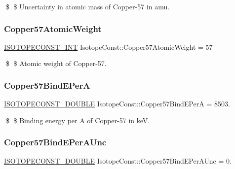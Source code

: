 \$ \$ Uncertainty in atomic mass of Copper-\/57 in amu. \mbox{\label{group___isotope_const-_copper-_cu57_ga404571e1951fa45e4c5f4a4f97b79bee}} 
\subsubsection{\texorpdfstring{Copper57\+Atomic\+Weight}{Copper57AtomicWeight}}
{\footnotesize\ttfamily \mbox{\hyperlink{group___isotope_const-_macros_ga5f18360b3e99483a35c32d789e62621c}{I\+S\+O\+T\+O\+P\+E\+C\+O\+N\+S\+T\+\_\+\+I\+NT}} Isotope\+Const\+::\+Copper57\+Atomic\+Weight = 57}

\$ \$ Atomic weight of Copper-\/57. \mbox{\label{group___isotope_const-_copper-_cu57_gab14120593a288dc566cf936b29a5cf2d}} 
\subsubsection{\texorpdfstring{Copper57\+Bind\+E\+PerA}{Copper57BindEPerA}}
{\footnotesize\ttfamily \mbox{\hyperlink{group___isotope_const-_macros_ga8f45a7272ce02c0b4c65c44636ed719a}{I\+S\+O\+T\+O\+P\+E\+C\+O\+N\+S\+T\+\_\+\+D\+O\+U\+B\+LE}} Isotope\+Const\+::\+Copper57\+Bind\+E\+PerA = 8503.}

\$ \$ Binding energy per A of Copper-\/57 in keV. \mbox{\label{group___isotope_const-_copper-_cu57_ga33245aefefe685427bd296c883bf00f5}} 
\subsubsection{\texorpdfstring{Copper57\+Bind\+E\+Per\+A\+Unc}{Copper57BindEPerAUnc}}
{\footnotesize\ttfamily \mbox{\hyperlink{group___isotope_const-_macros_ga8f45a7272ce02c0b4c65c44636ed719a}{I\+S\+O\+T\+O\+P\+E\+C\+O\+N\+S\+T\+\_\+\+D\+O\+U\+B\+LE}} Isotope\+Const\+::\+Copper57\+Bind\+E\+Per\+A\+Unc = 0.}

